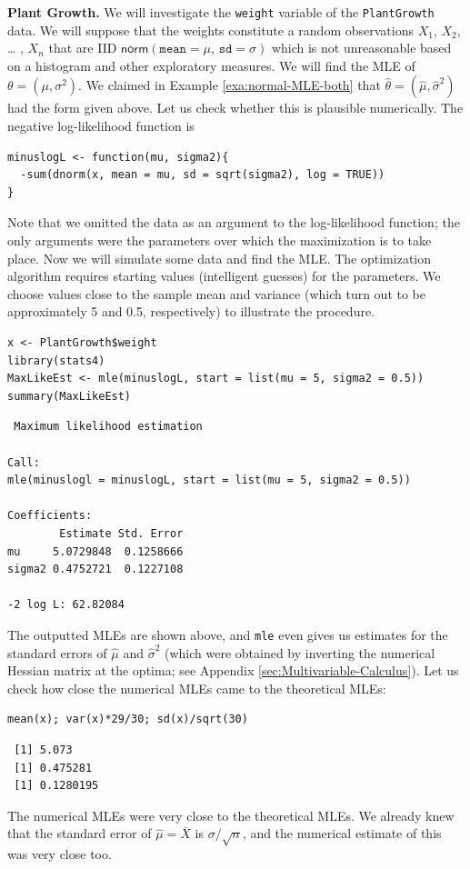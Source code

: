 \documentclass[captions=tableheading]{scrbook}
\begin{document}
\begin{example}

\textbf{Plant Growth.} We will investigate the \texttt{weight} variable of the \texttt{PlantGrowth} data. We will suppose that the weights constitute a random observations \(X_{1}\), \(X_{2}\), \ldots{} , \(X_{n}\) that are IID \(\mathsf{norm}(\mathtt{mean}=\mu,\,\mathtt{sd}=\sigma)\) which is not unreasonable based on a histogram and other exploratory measures. We will find the MLE of \(\theta=(\mu,\sigma^{2})\). We claimed in Example \ref{exa:normal-MLE-both} that \(\hat{\theta}=(\hat{\mu},\hat{\sigma}^{2})\) had the form given above. Let us check whether this is plausible numerically. The negative log-likelihood function is


\begin{verbatim}
minuslogL <- function(mu, sigma2){
  -sum(dnorm(x, mean = mu, sd = sqrt(sigma2), log = TRUE))
}
\end{verbatim}

Note that we omitted the data as an argument to the log-likelihood function; the only arguments were the parameters over which the maximization is to take place. Now we will simulate some data and find the MLE. The optimization algorithm requires starting values (intelligent guesses) for the parameters. We choose values close to the sample mean and variance (which turn out to be approximately 5 and 0.5, respectively) to illustrate the procedure.


\begin{verbatim}
x <- PlantGrowth$weight
library(stats4)
MaxLikeEst <- mle(minuslogL, start = list(mu = 5, sigma2 = 0.5))
summary(MaxLikeEst)
\end{verbatim}


\begin{verbatim}
 Maximum likelihood estimation

Call:
mle(minuslogl = minuslogL, start = list(mu = 5, sigma2 = 0.5))

Coefficients:
        Estimate Std. Error
mu     5.0729848  0.1258666
sigma2 0.4752721  0.1227108

-2 log L: 62.82084
\end{verbatim}

The outputted MLEs are shown above, and \texttt{mle} even gives us estimates for the standard errors of \(\hat{\mu}\) and \(\hat{\sigma}^{2}\) (which were obtained by inverting the numerical Hessian matrix at the optima; see Appendix \ref{sec:Multivariable-Calculus}). Let us check how close the numerical MLEs came to the theoretical MLEs:


\begin{verbatim}
mean(x); var(x)*29/30; sd(x)/sqrt(30)
\end{verbatim}

\begin{verbatim}
 [1] 5.073
 [1] 0.475281
 [1] 0.1280195
\end{verbatim}

The numerical MLEs were very close to the theoretical MLEs. We already knew that the standard error of \(\hat{\mu}=\overline{X}\) is \(\sigma/\sqrt{n}\), and the numerical estimate of this was very close too.

\end{example}
\end{document}
